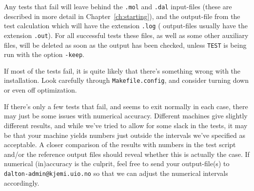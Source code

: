 Any tests that fail will leave behind the \verb|.mol| and \verb|.dal|
input-files (these are described in more detail in
Chapter~\ref{ch:starting}), and the output-file from the test
calculation which will have the extension \verb|.log| ({\dalton}
output-files usually have the extension \verb|.out|). For all
successful tests these files, as well as some other auxiliary files,
will be deleted as soon as the output has been checked, unless
\verb|TEST| is being run with the option \verb|-keep|.

If most of the tests fail, it is quite likely that there's something
wrong with the installation. Look carefully through
\verb|Makefile.config|, and consider turning down or even off
optimization.

If there's only a few tests that fail, and {\dalton} seems to exit
normally in each case, there may just be some issues with numerical
accuracy. Different machines give slightly different results, and
while we've tried to allow for some slack in the tests, it may be
that your machine yields numbers just outside the intervals we've
specified as acceptable. A closer comparison of the results with
numbers in the test script and/or the reference output files should
reveal whether this is actually the case. If numerical (in)accuracy is
the culprit, feel free to send your output-file(s) to
\verb|dalton-admin@kjemi.uio.no| so that we can adjust the numerical
intervals accordingly.
